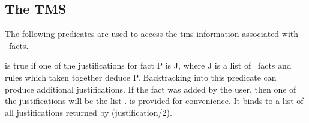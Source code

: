 \subsection{The TMS}

The following predicates are used to access the tms information
associated with \pfc\ facts.


 is true if one of the justifications for
fact P is J, where J is a list of \pfc\ facts and rules which taken
together deduce P.  Backtracking into this predicate can produce
additional justifications.  If the fact was added by the user, then
one of the justifications will be the list \prolog{[user]}.
 is provided for convenience.  It binds
 to a list of all justifications returned by
\prolog(justification/2).  





